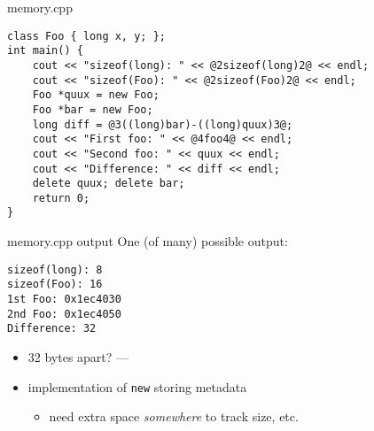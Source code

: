 \begin{frame}[fragile,label=memCpp]{memory.cpp}
\begin{lstlisting}
class Foo { long x, y; };
int main() {
    cout << "sizeof(long): " << @2sizeof(long)2@ << endl;
    cout << "sizeof(Foo): " << @2sizeof(Foo)2@ << endl;
    Foo *quux = new Foo;
    Foo *bar = new Foo;
    long diff = @3((long)bar)-((long)quux)3@;
    cout << "First foo: " << @4foo4@ << endl;
    cout << "Second foo: " << quux << endl;
    cout << "Difference: " << diff << endl;
    delete quux; delete bar;
    return 0;
}
\end{lstlisting}
\end{frame}

\begin{frame}[fragile,label=memCppOut]{memory.cpp output}
One (of many) possible output:
\begin{Verbatim}
sizeof(long): 8
sizeof(Foo): 16
1st Foo: 0x1ec4030
2nd Foo: 0x1ec4050
Difference: 32
\end{Verbatim}
\begin{itemize}
\item 32 bytes apart? --- 
\item implementation of \texttt{new} storing metadata
    \begin{itemize}
    \item need extra space \textit{somewhere} to track size, etc.
    \end{itemize}
\end{itemize}
\end{frame}
